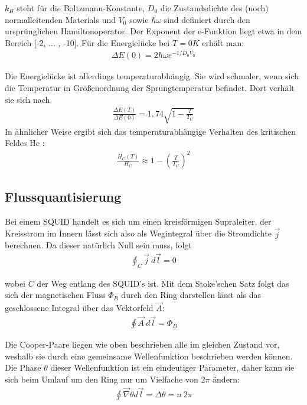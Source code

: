 \documentclass[12pt]{article}
\begin{document}
$k_B$ steht für die Boltzmann-Konstante, $D_0$ die Zustandsdichte des (noch) normalleitenden Materials und
$V_0$ sowie $\hbar \omega$ sind definiert durch den ursprünglichen Hamiltonoperator. Der Exponent der e-Funktion
liegt etwa in dem Bereich [-2, ... , -10].
Für die Energielücke bei $T = 0 K$ erhält man:
\begin{align}
 \Delta E(0) = 2\hbar\omega e^{-1 / D_0 V_0}
\end{align}

Die Energielücke ist allerdings temperaturabhängig. Sie wird schmaler, wenn sich die Temperatur in
Größenordnung der Sprungtemperatur befindet. Dort verhält sie sich nach
\begin{align}
 \frac{\Delta E(T)}{\Delta E(0)} = 1,74 \sqrt{ 1 - \frac{T}{T_C}}
\end{align}
In ähnlicher Weise ergibt sich das temperaturabhängige Verhalten des kritischen Feldes Hc :
\begin{align}
 \frac{H_C(T)}{H_C} \approx 1 - \left( \frac{T}{T_C} \right)^2
\end{align}

\subsection{Flussquantisierung}
\label{flussquantisierung}

Bei einem SQUID handelt es sich um einen kreisförmigen Supraleiter, der Kreisstrom im Innern lässt sich also als Wegintegral über die Stromdichte $\vec{j}$ berechnen. Da dieser natürlich Null sein muss, folgt
\begin{align}
 \label{kreisstrom} \oint_C \vec j ~ d\vec l = 0
\end{align}

wobei $C$ der Weg entlang des SQUID's ist. Mit dem Stoke'schen Satz folgt das sich der magnetischen Fluss $\Phi_B$ durch den Ring darstellen lässt als das geschlossene Integral über das Vektorfeld $\vec A$:
\begin{align}
 \oint\vec A~d\vec l = \Phi_B
\end{align}

Die Cooper-Paare liegen wie oben beschrieben alle im gleichen Zustand vor, weshalb sie durch eine gemeinsame Wellenfunktion beschrieben werden können. Die Phase $\theta$ dieser Wellenfunktion ist ein eindeutiger Parameter, daher kann sie sich beim Umlauf um den Ring nur um Vielfache von $2\pi$ ändern:
\begin{align}
\label{phase}\oint \vec\nabla \theta d\vec l = \Delta\theta = n~2\pi
\end{align}
\end{document}
